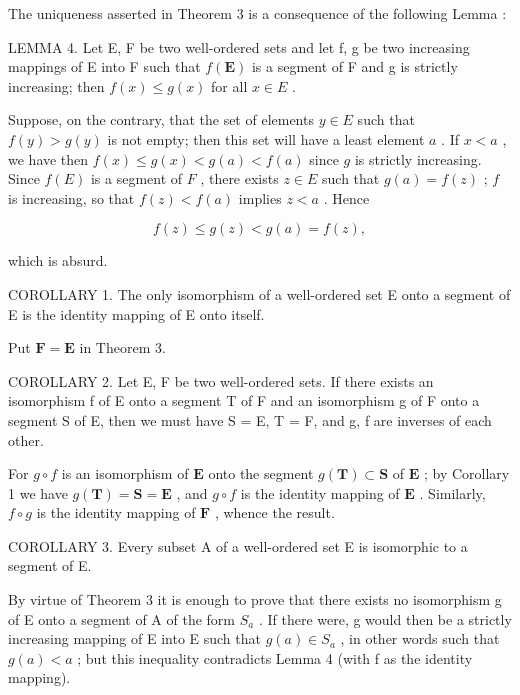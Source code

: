 The uniqueness asserted in Theorem 3 is a consequence of the following Lemma :

LEMMA 4. Let E, F be two well-ordered sets and let f, g be two increasing mappings of E into F such that \(f(\mathbf{E})\) is a segment of F and g is strictly increasing; then \(f(x) \leqslant g(x)\) for all \(x \in E\) .

Suppose, on the contrary, that the set of elements \(y \in E\) such that \(f(y) > g(y)\) is not empty; then this set will have a least element \(a\) . If \(x < a\) , we have then \(f(x) \leqslant g(x) < g(a) < f(a)\) since \(g\) is strictly increasing. Since \(f(E)\) is a segment of \(F\) , there exists \(z \in E\) such that \(g(a) = f(z)\) ; \(f\) is increasing, so that \(f(z) < f(a)\) implies \(z < a\) . Hence

\[
f (z) \leqslant g (z) <   g (a) = f (z),
\]

which is absurd.

COROLLARY 1. The only isomorphism of a well-ordered set E onto a segment of E is the identity mapping of E onto itself.

Put \(\mathbf{F} = \mathbf{E}\) in Theorem 3.

COROLLARY 2. Let E, F be two well-ordered sets. If there exists an isomorphism f of E onto a segment T of F and an isomorphism g of F onto a segment S of E, then we must have S = E, T = F, and g, f are inverses of each other.

For \(g \circ f\) is an isomorphism of \(\mathbf{E}\) onto the segment \(g(\mathbf{T}) \subset \mathbf{S}\) of \(\mathbf{E}\) ; by Corollary 1 we have \(g(\mathbf{T}) = \mathbf{S} = \mathbf{E}\) , and \(g \circ f\) is the identity mapping of \(\mathbf{E}\) . Similarly, \(f \circ g\) is the identity mapping of \(\mathbf{F}\) , whence the result.

COROLLARY 3. Every subset A of a well-ordered set E is isomorphic to a segment of E.

By virtue of Theorem 3 it is enough to prove that there exists no isomorphism g of E onto a segment of A of the form \(S_{a}\) . If there were, g would then be a strictly increasing mapping of E into E such that \(g(a) \in S_{a}\) , in other words such that \(g(a) < a\) ; but this inequality contradicts Lemma 4 (with f as the identity mapping).

